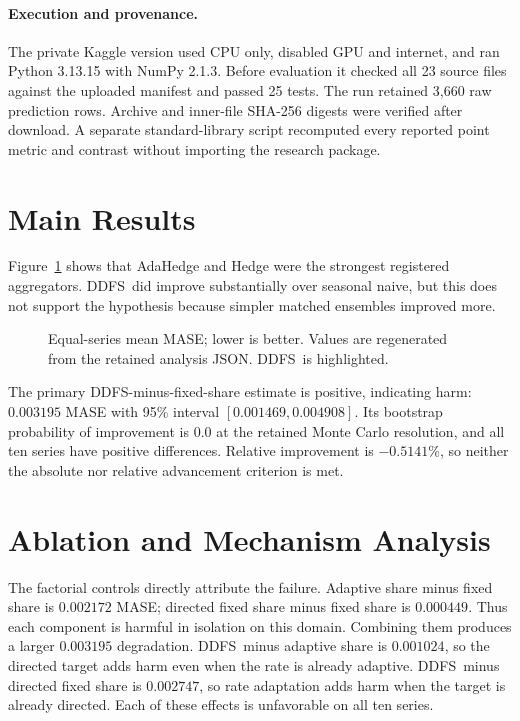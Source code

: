 \documentclass[10pt]{article}
\newcommand{\ddfs}{\textsc{DDFS}}
\begin{document}
\paragraph{Execution and provenance.}
The private Kaggle version used CPU only, disabled GPU and internet, and ran Python
3.13.15 with NumPy 2.1.3. Before evaluation it checked all 23 source files against
the uploaded manifest and passed 25 tests. The run retained 3,660 raw prediction
rows. Archive and inner-file SHA-256 digests were verified after download. A separate
standard-library script recomputed every reported point metric and contrast without
importing the research package.

\section{Main Results}



Figure~\ref{fig:mase} shows that AdaHedge and Hedge were the strongest registered
aggregators. \ddfs\ did improve substantially over seasonal naive, but this does not
support the hypothesis because simpler matched ensembles improved more.

\begin{figure}[t]
\centering

\caption{Equal-series mean MASE; lower is better. Values are regenerated from the
retained analysis JSON. \ddfs\ is highlighted.}
\label{fig:mase}
\end{figure}

The primary \ddfs-minus-fixed-share estimate is positive, indicating harm:
$0.003195$ MASE with 95\% interval $[0.001469,0.004908]$. Its bootstrap probability
of improvement is 0.0 at the retained Monte Carlo resolution, and all ten series
have positive differences. Relative improvement is $-0.5141\%$, so neither the
absolute nor relative advancement criterion is met.

\section{Ablation and Mechanism Analysis}

The factorial controls directly attribute the failure. Adaptive share minus fixed
share is $0.002172$ MASE; directed fixed share minus fixed share is $0.000449$.
Thus each component is harmful in isolation on this domain. Combining them produces
a larger $0.003195$ degradation. \ddfs\ minus adaptive share is $0.001024$, so the
directed target adds harm even when the rate is already adaptive. \ddfs\ minus
directed fixed share is $0.002747$, so rate adaptation adds harm when the target is
already directed. Each of these effects is unfavorable on all ten series.
\end{document}
